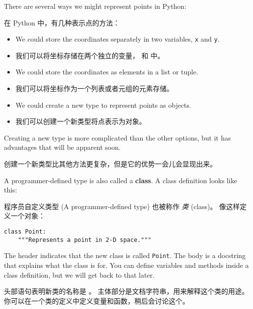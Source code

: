 There are several ways we might represent points in Python:

在 Python 中，有几种表示点的方法：

\begin{itemize}

\item We could store the coordinates separately in two
variables, {\tt x} and {\tt y}.

\item 我们可以将坐标存储在两个独立的变量， 和  中。

\item We could store the coordinates as elements in a list
or tuple.

\item 我们可以将坐标作为一个列表或者元组的元素存储。

\item We could create a new type to represent points as
objects.

\item 我们可以创建一个新类型将点表示为对象。

\end{itemize}

Creating a new type
is more complicated than the other options, but
it has advantages that will be apparent soon.

创建一个新类型比其他方法更复杂，但是它的优势一会儿会显现出来。

A programmer-defined type is also called a {\bf class}.
A class definition looks like this:

程序员自定义类型 (A programmer-defined type) 也被称作 {\em 类} (class)。  像这样定义一个对象：

  
  

\begin{lstlisting}
class Point:
    """Represents a point in 2-D space."""
\end{lstlisting}
%
The header indicates that the new class is called {\tt Point}.
The body is a docstring that explains what the class is for.
You can define variables and methods inside a class definition,
but we will get back to that later.

头部语句表明新类的名称是  。
主体部分是文档字符串，用来解释这个类的用途。
你可以在一个类的定义中定义变量和函数，稍后会讨论这个。

    

